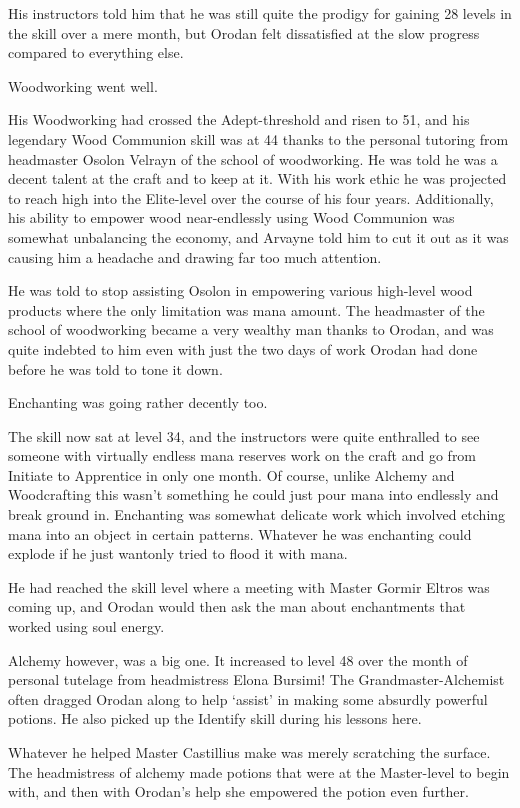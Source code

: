 \documentclass[a4paper,10pt]{book}
\begin{document}
His instructors told him that he was still quite the prodigy for gaining 28 levels in the skill over a mere month, but Orodan felt dissatisfied at the slow progress compared to everything else.\par
Woodworking went well.\par
His Woodworking had crossed the Adept-threshold and risen to 51, and his legendary Wood Communion skill was at 44 thanks to the personal tutoring from headmaster Osolon Velrayn of the school of woodworking. He was told he was a decent talent at the craft and to keep at it. With his work ethic he was projected to reach high into the Elite-level over the course of his four years. Additionally, his ability to empower wood near-endlessly using Wood Communion was somewhat unbalancing the economy, and Arvayne told him to cut it out as it was causing him a headache and drawing far too much attention.\par
He was told to stop assisting Osolon in empowering various high-level wood products where the only limitation was mana amount. The headmaster of the school of woodworking became a very wealthy man thanks to Orodan, and was quite indebted to him even with just the two days of work Orodan had done before he was told to tone it down.\par
Enchanting was going rather decently too.\par
The skill now sat at level 34, and the instructors were quite enthralled to see someone with virtually endless mana reserves work on the craft and go from Initiate to Apprentice in only one month. Of course, unlike Alchemy and Woodcrafting this wasn’t something he could just pour mana into endlessly and break ground in. Enchanting was somewhat delicate work which involved etching mana into an object in certain patterns. Whatever he was enchanting could explode if he just wantonly tried to flood it with mana.\par
He had reached the skill level where a meeting with Master Gormir Eltros was coming up, and Orodan would then ask the man about enchantments that worked using soul energy.\par
Alchemy however, was a big one. It increased to level 48 over the month of personal tutelage from headmistress Elona Bursimi! The Grandmaster-Alchemist often dragged Orodan along to help ‘assist’ in making some absurdly powerful potions. He also picked up the Identify skill during his lessons here.\par
Whatever he helped Master Castillius make was merely scratching the surface. The headmistress of alchemy made potions that were at the Master-level to begin with, and then with Orodan’s help she empowered the potion even further.\par
\end{document}
